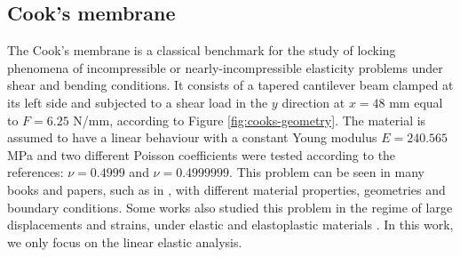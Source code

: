 \documentclass[english,11pt,3p,number,sort&compress]{elsarticle}
\begin{document}

\subsection{Cook's membrane \label{subsec:cook}}

The Cook's membrane is a classical benchmark for the study of locking phenomena of incompressible or nearly-incompressible elasticity problems under shear and bending conditions. It consists of a tapered cantilever beam clamped at its left side and subjected to a shear load in the $y$ direction at $x=48$ mm equal to $F=6.25$ N/mm, according to Figure \ref{fig:cooks-geometry}. The material is assumed to have a linear behaviour with a constant Young modulus $E=240.565$ MPa and two different Poisson coefficients were tested according to the references: $\nu=0.4999$ and $\nu=0.4999999$. This problem can be seen in many books and papers, such as in \cite{cook1989concepts,elguedj2008b,cesar1999new}, with different material properties, geometries and boundary conditions. Some works also studied this problem in the regime of large displacements and strains, under elastic and elastoplastic materials \cite{chavan2007locking,elguedj2008b,de1996design}. In this work, we only focus on the linear elastic analysis.
\end{document}
